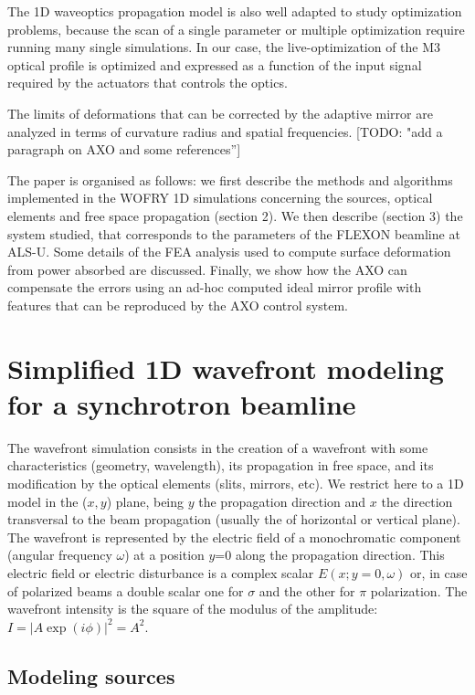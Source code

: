 \documentclass[]{spie}  %
\newcommand{\todo}[1]{{\color{red}[TODO: "#1'']}}
\begin{document}
The 1D waveoptics propagation model is also well adapted to study optimization problems, because the scan of a single parameter or multiple optimization require running many single simulations. In our case, the live-optimization of the M3 optical profile is optimized and expressed as a function of the input signal required by the actuators that controls the optics. 

The limits of deformations that can be corrected by the adaptive mirror are analyzed in terms of curvature radius and spatial frequencies. \todo{add a paragraph on AXO and some references}

The paper is organised as follows: we first describe the methods and algorithms implemented in the WOFRY 1D simulations concerning the sources, optical elements and free space propagation (section 2). We then describe (section 3) the system studied, that corresponds to the parameters of the FLEXON beamline at ALS-U. Some details of the FEA analysis used to compute surface deformation from power absorbed are discussed. Finally, we show how the AXO can compensate the errors using an ad-hoc computed ideal mirror profile with features that can be reproduced by the AXO control system.  


\section{Simplified 1D wavefront modeling for a synchrotron beamline}


The wavefront simulation consists in the creation of a wavefront with some characteristics (geometry, wavelength), its propagation in free space, and its modification by the optical elements (slits, mirrors, etc). We restrict here to a 1D model in the ($x,y$) plane, being $y$ the propagation direction and $x$ the direction transversal to the beam propagation (usually the of horizontal or vertical plane). The wavefront is represented by the electric field of a monochromatic component (angular frequency $\omega$) at a position $y$=0 along the propagation direction. This electric field or electric disturbance is a complex scalar $E(x;y=0,\omega)$ or, in case of polarized beams a double scalar one for $\sigma$ and the other for $\pi$ polarization. The wavefront intensity is the square of the modulus of the amplitude: $I=|A \exp{(i\phi)}|^2=A^2$. 

\subsection{Modeling sources}
\label{sec:sources}
\end{document}

